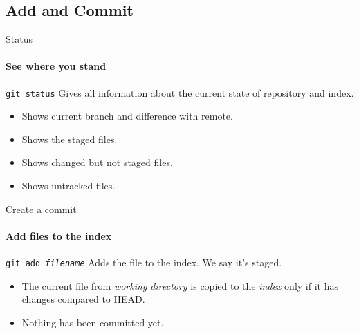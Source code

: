 \documentclass{beamer}
\begin{document}
\subsection{Add and Commit}

\begin{frame}{Status}
\framesubtitle{See where you stand}

\begin{block}{	\texttt{git status}}
	Gives all information about the current state of repository and index.
\end{block}

\begin{itemize}
	\item Shows current branch and difference with remote.
	\item Shows the staged files.
	\item Shows changed but not staged files.
	\item Shows untracked files.
\end{itemize}

\end{frame}

\begin{frame}{Create a commit}
\framesubtitle{Add files to the index}

\begin{block}{	\texttt{git add \emph{filename}}}
	Adds the file to the index. We say it's \alert{staged}.
\end{block}

\begin{itemize}
	\item The current file from \emph{working directory} is copied to the \emph{index} only if it has changes compared to HEAD.
	\item Nothing has been committed yet.
\end{itemize}

\end{frame}
\end{document}
